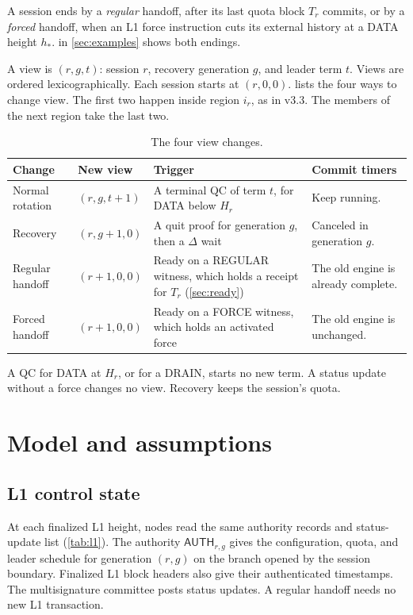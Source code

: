 \documentclass[11pt,a4paper]{article}
\newcommand{\tagg}[1]{\ensuremath{\mathsf{#1}}}
\begin{document}
A session ends by a \emph{regular} handoff, after its last quota block
$T_r$ commits, or by a \emph{forced} handoff, when an L1 force
instruction cuts its external history at a DATA height $h_*$.
 in \cref{sec:examples} shows both endings.

A view is $(r,g,t)$: session $r$, recovery generation $g$, and leader
term $t$. Views are ordered lexicographically. Each session starts at
$(r,0,0)$.  lists the four ways to change view. The
first two happen inside region $i_r$, as in v3.3. The members of the
next region take the last two.

\begin{table}[htbp]\centering\small
\caption{The four view changes.}
\label{tab:views}
\begin{tabularx}{\linewidth}{@{}>{\raggedright\arraybackslash}p{.19\linewidth}>{\raggedright\arraybackslash}p{.12\linewidth}Y>{\raggedright\arraybackslash}p{.23\linewidth}@{}}
\toprule
Change & New view & Trigger & Commit timers\\
\midrule
Normal rotation & $(r,g,t+1)$ & A terminal QC of term $t$, for DATA below $H_r$ & Keep running.\\
Recovery & $(r,g+1,0)$ & A quit proof for generation $g$, then a $\Delta$ wait & Canceled in generation $g$.\\
Regular handoff & $(r+1,0,0)$ & Ready on a REGULAR witness, which holds a receipt for $T_r$ (\cref{sec:ready}) & The old engine is already complete.\\
Forced handoff & $(r+1,0,0)$ & Ready on a FORCE witness, which holds an activated force & The old engine is unchanged.\\
\bottomrule
\end{tabularx}
\end{table}
A QC for DATA at $H_r$, or for a DRAIN, starts no new term. A status
update without a force changes no view. Recovery keeps the session's
quota.

\section{Model and assumptions}
\label{sec:model}

\subsection{L1 control state}
\label{sec:l1}
At each finalized L1 height, nodes read the same authority records and
status-update list (\cref{tab:l1}). The authority
$\tagg{AUTH}_{r,g}$ gives the configuration, quota, and leader schedule
for generation $(r,g)$ on the branch opened by the session boundary.
Finalized L1 block headers also give their authenticated timestamps.
The multisignature committee posts status updates. A regular handoff
needs no new L1 transaction.
\end{document}
